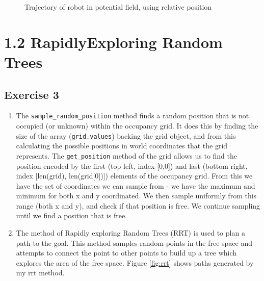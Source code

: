 \documentclass[12pt,a4paper]{article}
\begin{document}
\begin{enumerate}[label=(\alph*)]
\begin{figure}[!h]
		\caption{Trajectory of robot in potential field, using relative position}
		\label{fig:trajectory}
	\end{figure}

\end{enumerate}

\section*{1.2 Rapidly\-Exploring Random Trees}

\subsection*{Exercise 3}
\begin{enumerate}[label=(\alph*)]
	\item The \texttt{sample\_random\_position} method finds a random position that is not occupied (or unknown) within the occupancy grid. It does this by finding the size of the array (\texttt{grid.values}) backing the grid object, and from this calculating the possible positions in world coordinates that the grid represents. The \texttt{get\_position} method of the grid allows us to find the position encoded by the first (top left, index [0,0]) and last (bottom right, index [len(grid), len(grid[0])]) elements of the occupancy grid. From this we have the set of coordinates we can sample from - we have the maximum and minimum for both x and y coordinated. We then sample uniformly from this range (both x and y), and check if that position is free. We continue sampling until we find a position that is free.
	\item The method of Rapidly exploring Random Trees (RRT) is used to plan a path to the goal. This method samples random points in the free space and attempts to connect the point to other points to build up a tree which explores the area of the free space. Figure \ref{fig:rrt} shows paths generated by my rrt method.
	\begin{figure}[h!]
		\centering

\end{figure}
\end{enumerate}
\end{document}
